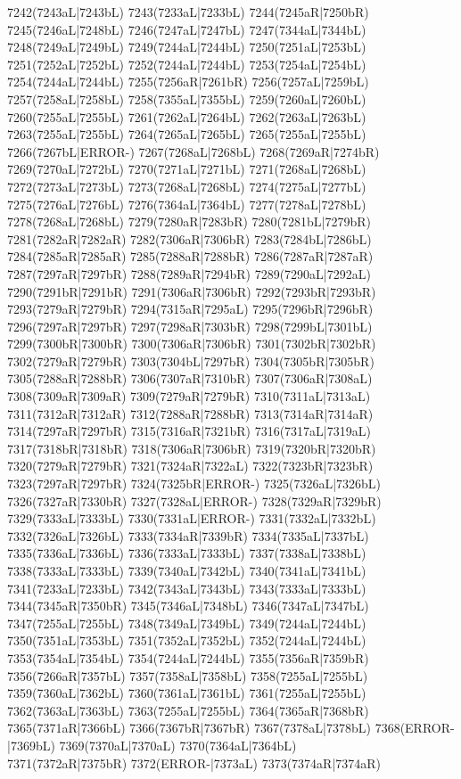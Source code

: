 7242(7243aL|7243bL) 7243(7233aL|7233bL) 7244(7245aR|7250bR) \\7245(7246aL|7248bL) 7246(7247aL|7247bL) 7247(7344aL|7344bL) 7248(7249aL|7249bL) 7249(7244aL|7244bL) 7250(7251aL|7253bL) 7251(7252aL|7252bL) 7252(7244aL|7244bL) 7253(7254aL|7254bL) \\7254(7244aL|7244bL) 7255(7256aR|7261bR) 7256(7257aL|7259bL) 7257(7258aL|7258bL) 7258(7355aL|7355bL) 7259(7260aL|7260bL) 7260(7255aL|7255bL) 7261(7262aL|7264bL) 7262(7263aL|7263bL) \\7263(7255aL|7255bL) 7264(7265aL|7265bL) 7265(7255aL|7255bL) 7266(7267bL|ERROR-) 7267(7268aL|7268bL) 7268(7269aR|7274bR) 7269(7270aL|7272bL) 7270(7271aL|7271bL) 7271(7268aL|7268bL) \\7272(7273aL|7273bL) 7273(7268aL|7268bL) 7274(7275aL|7277bL) 7275(7276aL|7276bL) 7276(7364aL|7364bL) 7277(7278aL|7278bL) 7278(7268aL|7268bL) 7279(7280aR|7283bR) 7280(7281bL|7279bR) \\7281(7282aR|7282aR) 7282(7306aR|7306bR) 7283(7284bL|7286bL) 7284(7285aR|7285aR) 7285(7288aR|7288bR) 7286(7287aR|7287aR) 7287(7297aR|7297bR) 7288(7289aR|7294bR) 7289(7290aL|7292aL) \\7290(7291bR|7291bR) 7291(7306aR|7306bR) 7292(7293bR|7293bR) 7293(7279aR|7279bR) 7294(7315aR|7295aL) 7295(7296bR|7296bR) 7296(7297aR|7297bR) 7297(7298aR|7303bR) 7298(7299bL|7301bL) \\7299(7300bR|7300bR) 7300(7306aR|7306bR) 7301(7302bR|7302bR) 7302(7279aR|7279bR) 7303(7304bL|7297bR) 7304(7305bR|7305bR) 7305(7288aR|7288bR) 7306(7307aR|7310bR) 7307(7306aR|7308aL) \\7308(7309aR|7309aR) 7309(7279aR|7279bR) 7310(7311aL|7313aL) 7311(7312aR|7312aR) 7312(7288aR|7288bR) 7313(7314aR|7314aR) 7314(7297aR|7297bR) 7315(7316aR|7321bR) 7316(7317aL|7319aL) \\7317(7318bR|7318bR) 7318(7306aR|7306bR) 7319(7320bR|7320bR) 7320(7279aR|7279bR) 7321(7324aR|7322aL) 7322(7323bR|7323bR) 7323(7297aR|7297bR) 7324(7325bR|ERROR-) 7325(7326aL|7326bL) \\7326(7327aR|7330bR) 7327(7328aL|ERROR-) 7328(7329aR|7329bR) 7329(7333aL|7333bL) 7330(7331aL|ERROR-) 7331(7332aL|7332bL) 7332(7326aL|7326bL) 7333(7334aR|7339bR) 7334(7335aL|7337bL) \\7335(7336aL|7336bL) 7336(7333aL|7333bL) 7337(7338aL|7338bL) 7338(7333aL|7333bL) 7339(7340aL|7342bL) 7340(7341aL|7341bL) 7341(7233aL|7233bL) 7342(7343aL|7343bL) 7343(7333aL|7333bL) \\7344(7345aR|7350bR) 7345(7346aL|7348bL) 7346(7347aL|7347bL) 7347(7255aL|7255bL) 7348(7349aL|7349bL) 7349(7244aL|7244bL) 7350(7351aL|7353bL) 7351(7352aL|7352bL) 7352(7244aL|7244bL) \\7353(7354aL|7354bL) 7354(7244aL|7244bL) 7355(7356aR|7359bR) 7356(7266aR|7357bL) 7357(7358aL|7358bL) 7358(7255aL|7255bL) 7359(7360aL|7362bL) 7360(7361aL|7361bL) 7361(7255aL|7255bL) \\7362(7363aL|7363bL) 7363(7255aL|7255bL) 7364(7365aR|7368bR) 7365(7371aR|7366bL) 7366(7367bR|7367bR) 7367(7378aL|7378bL) 7368(ERROR-|7369bL) 7369(7370aL|7370aL) 7370(7364aL|7364bL) \\7371(7372aR|7375bR) 7372(ERROR-|7373aL) 7373(7374aR|7374aR) 